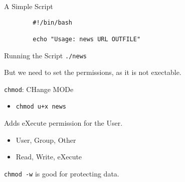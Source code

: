 \documentclass[pdf,usenames,dvipsnames,14pt]{beamer}%
\newcommand\hyphen{\char`\-}
\begin{document}
\begin{frame}[fragile]{A Simple Script}
	\begin{verbatim}
		#!/bin/bash
		
		echo "Usage: news URL OUTFILE"
	\end{verbatim}
\end{frame}

\begin{frame}{Running the Script}
	\texttt{./news}
	
	But we need to set the permissions, as it is not exectable.
	
	\texttt{chmod}: CHange MODe
	\begin{itemize}
		\item \texttt{chmod u+x news}
	\end{itemize}
	Adds eXecute permission for the User.
	\begin{itemize}
		\item User, Group, Other
		\item Read, Write, eXecute
	\end{itemize}
	\texttt{chmod -w} is good for protecting data.
	\note{
		\texttt{ls \hyphen l}
	}
\end{frame}
\end{document}

